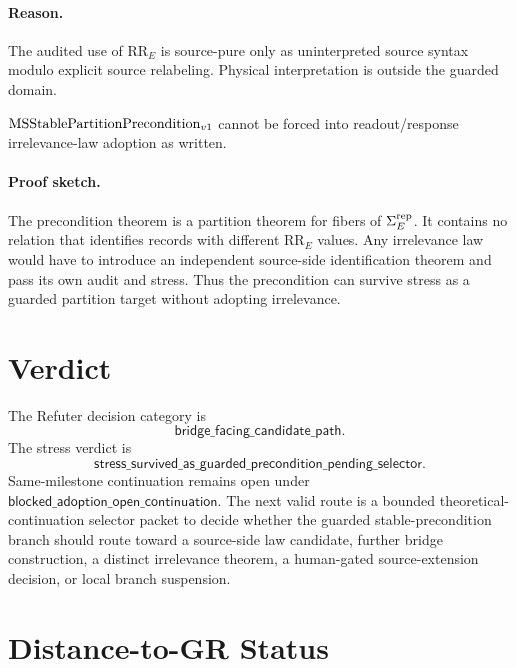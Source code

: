 \paragraph{Reason.}
The audited use of \(\mathrm{RR}_E\) is source-pure only as uninterpreted
source syntax modulo explicit source relabeling. Physical interpretation is
outside the guarded domain.

\begin{proposition}
\(\mathrm{MSStablePartitionPrecondition}_{v1}\) cannot be forced into readout/response irrelevance-law
adoption as written.
\end{proposition}

\paragraph{Proof sketch.}
The precondition theorem is a partition theorem for fibers of \(\Sigma^{\mathrm{rep}}_E\). It
contains no relation that identifies records with different \(\mathrm{RR}_E\)
values. Any irrelevance law would have to introduce an independent
source-side identification theorem and pass its own audit and stress. Thus the
precondition can survive stress as a guarded partition target without
adopting irrelevance.

\section{Verdict}

The Refuter decision category is
\[
  \mathsf{bridge\_facing\_candidate\_path}.
\]
The stress verdict is
\[
  \mathsf{stress\_survived\_as\_guarded\_precondition\_pending\_selector}.
\]
Same-milestone continuation remains open under
\(\mathsf{blocked\_adoption\_open\_continuation}\). The next valid route is a
bounded theoretical-continuation selector packet to decide whether the guarded
stable-precondition branch should route toward a source-side law candidate,
further bridge construction, a distinct irrelevance theorem, a human-gated
source-extension decision, or local branch suspension.

\section{Distance-to-GR Status}

